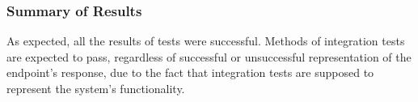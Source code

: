 \subsubsection{Summary of Results}

As expected, all the results of tests were successful. Methods of integration tests are expected to pass, regardless of successful or unsuccessful representation of the endpoint's response, due to the fact that integration tests are supposed to represent the system's functionality.
